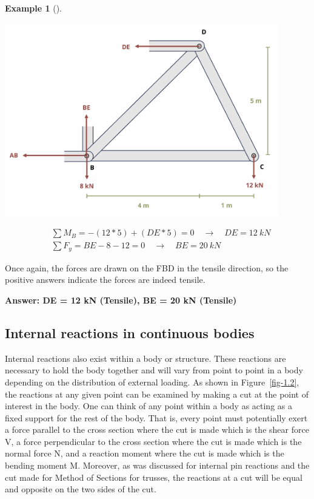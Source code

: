\documentclass[
  letterpaper,
  DIV=11,
  numbers=noendperiod]{scrreprt}
\theoremstyle{definition}
\newtheorem{example}{Example}[chapter]
\theoremstyle{remark}
\begin{document}
\begin{tcolorbox}
\begin{example}[]
\begin{tcolorbox}
\begin{center}
\includegraphics[width=4.6875in,height=\textheight]{images/Updated CH1 examples/example 1.4 part 6.png}
\end{center}

\[
\begin{aligned}
& \sum M_B=-(12*5)+(DE*5)=0 \quad\rightarrow\quad D E=12{~kN} \\
& \sum F_y=BE-8-12=0 \quad\rightarrow\quad B E=20{~kN}
\end{aligned}
\]

Once again, the forces are drawn on the FBD in the tensile direction, so
the positive answers indicate the forces are indeed tensile.

\textbf{Answer: DE = 12 kN (Tensile), BE = 20 kN (Tensile)}

\end{tcolorbox}

\end{example}

\end{tcolorbox}

\subsection{Internal reactions in continuous
bodies}\label{internal-reactions-in-continuous-bodies}

Internal reactions also exist within a body or structure. These
reactions are necessary to hold the body together and will vary from
point to point in a body depending on the distribution of external
loading. As shown in Figure~\ref{fig-1.2}, the reactions at any given
point can be examined by making a cut at the point of interest in the
body. One can think of any point within a body as acting as a fixed
support for the rest of the body. That is, every point must potentially
exert a force parallel to the cross section where the cut is made which
is the shear force V, a force perpendicular to the cross section where
the cut is made which is the normal force N, and a reaction moment where
the cut is made which is the bending moment M. Moreover, as was
discussed for internal pin reactions and the cut made for Method of
Sections for trusses, the reactions at a cut will be equal and opposite
on the two sides of the cut.
\end{document}
